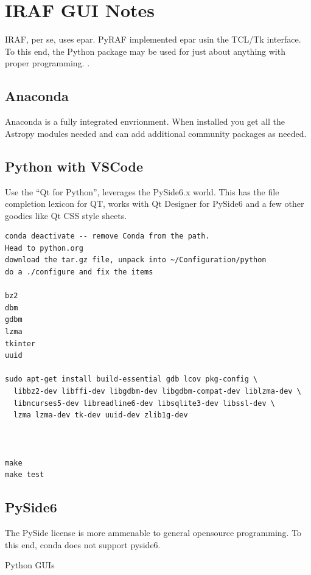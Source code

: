 \renewcommand{\footerfilename}{PythonGUI.tex}

\section{IRAF GUI Notes} \label{sec:IRAFGUINotes}

IRAF, per se, uses epar. PyRAF implemented epar usin the TCL/Tk interface.
To this end, the Python package  may be used for just about
anything with proper programming.  
.

\subsection{Anaconda} \label{sec:PythonAnaconda}

Anaconda is a fully integrated envrionment. When installed you get
all the Astropy modules needed and can add additional community
packages as needed. 

\subsection{Python with VSCode}  \label{sec:PythonWithVSCode}

Use the ``Qt for Python'', leverages the PySide6.x world.
This has the file completion lexicon for QT, works with Qt Designer
for PySide6 and a few other goodies like Qt CSS style sheets.

\begingroup \fontsize{10pt}{10pt}
\selectfont
\begin{verbatim} 
conda deactivate -- remove Conda from the path.
Head to python.org
download the tar.gz file, unpack into ~/Configuration/python
do a ./configure and fix the items

bz2
dbm
gdbm
lzma
tkinter
uuid

sudo apt-get install build-essential gdb lcov pkg-config \
  libbz2-dev libffi-dev libgdbm-dev libgdbm-compat-dev liblzma-dev \
  libncurses5-dev libreadline6-dev libsqlite3-dev libssl-dev \
  lzma lzma-dev tk-dev uuid-dev zlib1g-dev



make 
make test
\end{verbatim}
\endgroup


\subsection{PySide6}

The PySide license is more ammenable to general opensource programming.
To this end, conda does not support pyside6.

Python GUIs



